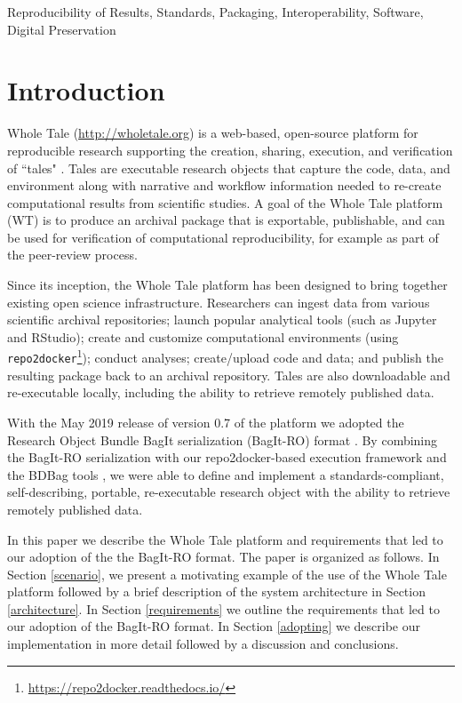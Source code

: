 \documentclass[conference]{IEEEtran}
\begin{document}
\begin{IEEEkeywords}
Reproducibility of Results, Standards, Packaging, Interoperability, Software, Digital Preservation
\end{IEEEkeywords}

\section{Introduction}


Whole Tale (\url{http://wholetale.org}) is a web-based, open-source platform for reproducible research 
supporting the creation, sharing, execution, and verification of ``tales" \cite{brinckman2019, chard2019}. Tales are executable research objects that capture the code, data, and environment along with narrative and workflow information needed to re-create computational results from scientific studies. A goal of the Whole Tale platform (WT) is to produce an archival package that is exportable, publishable, and can be used for verification of computational reproducibility, for example as part of the peer-review process.

Since its inception, the Whole Tale platform has been designed to bring together existing open 
science infrastructure.  Researchers can ingest data from various scientific archival 
repositories; launch popular analytical tools (such as Jupyter and RStudio); create and customize 
computational environments (using \texttt{repo2docker}\footnote{\url{https://repo2docker.readthedocs.io/}}); 
conduct analyses; create/upload code and data; and publish the resulting package back to an
archival repository. Tales are also downloadable and re-executable locally, including the 
ability to retrieve remotely published data.  

With the May 2019 release of version 0.7 of the platform we adopted the Research Object Bundle BagIt serialization (BagIt-RO) format \cite{soilandreyes2014}. By combining the BagIt-RO 
serialization with our repo2docker-based execution framework and the BDBag tools 
\cite{chard2016}, we were able to define and implement a standards-compliant, self-describing, 
portable, re-executable research object with the ability to retrieve remotely published data.  

In this paper we describe the Whole Tale platform and requirements that led to our adoption of the
the BagIt-RO format. The paper is organized as follows. In Section \ref{scenario}, we present a 
motivating example of the  use of the Whole Tale platform followed by a brief description of the 
system architecture in Section \ref{architecture}. In Section \ref{requirements} we outline the 
requirements that led to our adoption of the BagIt-RO format. In Section \ref{adopting} we describe
our implementation in more detail followed by a discussion and conclusions.
\end{document}

